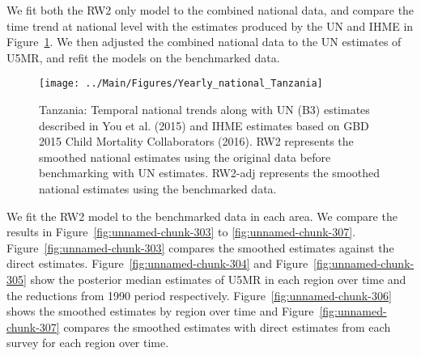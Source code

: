 \documentclass[12pt]{article}\usepackage[]{graphicx}\usepackage[]{color}
\newenvironment{knitrout}{}{} %
\begin{document}
We fit both the RW2 only model to the combined national data, and compare the time trend at national level with the estimates produced by the UN and IHME in Figure~\ref{fig:unnamed-chunk-302}. We then adjusted the combined national data to the UN estimates of U5MR, and refit the models on the benchmarked data. 

\begin{knitrout}
\color{fgcolor}\begin{figure}[bht]

{\centering \texttt{[image: ../Main/Figures/Yearly\_national\_Tanzania]} 

}

\caption[Tanzania]{Tanzania: Temporal national trends along with UN (B3) estimates described in You et al. (2015) and IHME estimates based on GBD 2015 Child Mortality Collaborators (2016). RW2 represents the smoothed national estimates using the original data before benchmarking with UN estimates. RW2-adj represents the smoothed national estimates using the benchmarked data.}\label{fig:unnamed-chunk-302}
\end{figure}


\end{knitrout}
 

We fit the RW2 model to the benchmarked data in each area. 
We compare the results in Figure~\ref{fig:unnamed-chunk-303} to \ref{fig:unnamed-chunk-307}.
Figure~\ref{fig:unnamed-chunk-303} compares the smoothed estimates against the direct estimates. Figure~\ref{fig:unnamed-chunk-304} and Figure~\ref{fig:unnamed-chunk-305} show the posterior median estimates of U5MR in each region over time and the reductions from 1990 period respectively.
Figure~\ref{fig:unnamed-chunk-306} shows the smoothed estimates by region over time and Figure~\ref{fig:unnamed-chunk-307} compares the smoothed estimates with direct estimates from each survey for each region over time.




\end{document}
